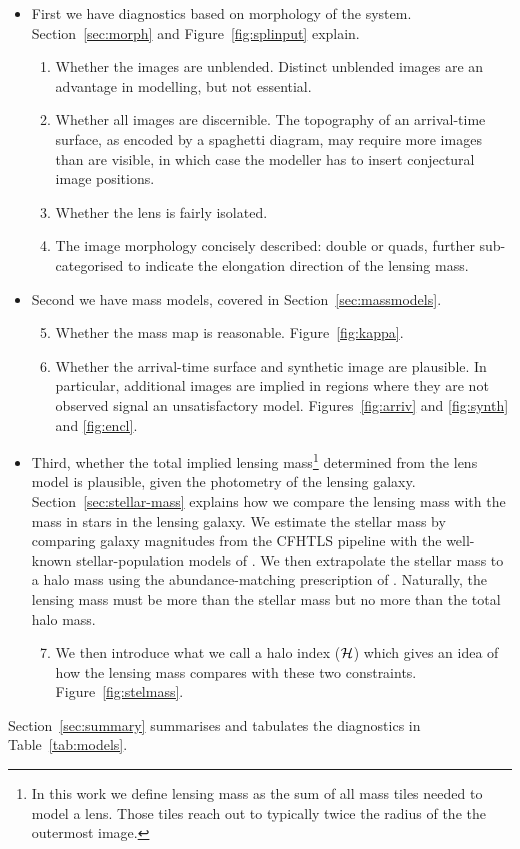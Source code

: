 \begin{itemize}
\item First we have diagnostics based on morphology of the
  system.
  Section~\ref{sec:morph} and Figure~\ref{fig:splinput} explain.
\begin{enumerate}
\item Whether the images are unblended.  Distinct unblended images are
  an advantage in modelling, but not essential.
\item Whether all images are discernible.  The topography of an
  arrival-time surface, as encoded by a spaghetti diagram, may require
  more images than are visible, in which case the modeller has to
  insert conjectural image positions.
\item Whether the lens is fairly isolated.
\item The image morphology concisely described: double or quads,
  further sub-categorised to indicate the elongation direction of the
  lensing mass.
\end{enumerate}
\item Second we have mass models, covered in Section~\ref{sec:massmodels}.
\begin{enumerate}
\setcounter{enumi}{4}
\item Whether the mass map is reasonable. Figure~\ref{fig:kappa}.
\item Whether the arrival-time surface and synthetic image are
  plausible.  In particular, additional images are implied in regions
  where they are not observed signal an unsatisfactory model.
  Figures~\ref{fig:arriv} and \ref{fig:synth} and \ref{fig:encl}.
\end{enumerate}
\item Third, whether the total implied lensing mass\footnote{
    In this work we define lensing mass as the sum of all mass tiles
    needed to model a lens. Those tiles reach out to typically twice
    the radius of the the outermost image. }
  determined from the lens model is plausible, given the
  photometry of the lensing galaxy.  Section~\ref{sec:stellar-mass}
  explains how we compare the lensing mass with the mass in stars in
  the lensing galaxy.  We estimate the stellar mass by comparing
  galaxy magnitudes from the CFHTLS pipeline with the well-known
  stellar-population models of \cite{2003MNRAS.344.1000B}.  We then
  extrapolate the stellar mass to a halo mass using the
  abundance-matching prescription of \cite{2010ApJ...710..903M}.
  Naturally, the lensing mass must be more than the stellar mass but
  no more than the total halo mass.
\begin{enumerate}
\setcounter{enumi}{6}
\item We then introduce what we call a halo index ($\mathcal{H}$) which
  gives an idea of how the lensing mass compares with these two
  constraints.  Figure~\ref{fig:stelmass}.
\end{enumerate}
\end{itemize}

Section~\ref{sec:summary} summarises and tabulates the diagnostics in
Table~\ref{tab:models}.




